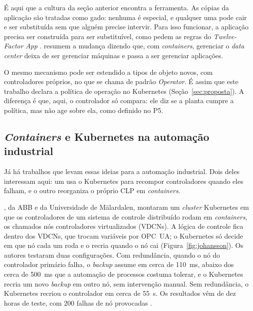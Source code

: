 É aqui que a cultura da seção anterior encontra a ferramenta. As cópias da aplicação são tratadas como gado: nenhuma é especial, e qualquer uma pode cair e ser substituída sem que alguém precise intervir. Para isso funcionar, a aplicação precisa ser construída para ser substituível, como pedem as regras do \textit{Twelve-Factor App} \cite{Wiggins2011}.  resumem a mudança dizendo que, com \textit{containers}, gerenciar o \textit{data center} deixa de ser gerenciar máquinas e passa a ser gerenciar aplicações.

O mesmo mecanismo pode ser estendido a tipos de objeto novos, com controladores próprios, no que se chama de padrão \textit{Operator}. É assim que este trabalho declara a política de operação no Kubernetes (Seção~\ref{sec:proposta}). A diferença é que, aqui, o controlador só compara: ele diz se a planta cumpre a política, mas não age sobre ela, como definido no P5.

\subsection{\textit{Containers} e Kubernetes na automação industrial}

Já há trabalhos que levam essas ideias para a automação industrial. Dois deles interessam aqui: um usa o Kubernetes para recompor controladores quando eles falham, e o outro reorganiza o próprio CLP em \textit{containers}.

, da ABB e da Universidade de Mälardalen, montaram um \textit{cluster} Kubernetes em que os controladores de um sistema de controle distribuído rodam em \textit{containers}, os chamados nós controladores virtualizados (VDCNs). A lógica de controle fica dentro dos VDCNs, que trocam variáveis por OPC~UA; o Kubernetes só decide em que nó cada um roda e o recria quando o nó cai (Figura~\ref{fig:johansson}). Os autores testaram duas configurações. Com redundância, quando o nó do controlador primário falha, o \textit{backup} assume em cerca de 110~ms, abaixo dos cerca de 500~ms que a automação de processos costuma tolerar, e o Kubernetes recria um novo \textit{backup} em outro nó, sem intervenção manual. Sem redundância, o Kubernetes recriou o controlador em cerca de 55~s. Os resultados vêm de dez horas de teste, com 200 falhas de nó provocadas \cite{Johansson2022}.

